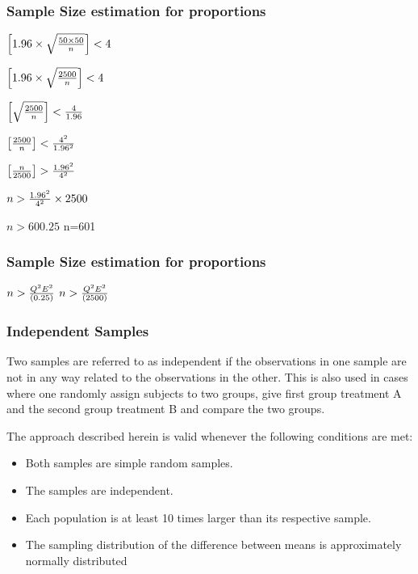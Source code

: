 \begin{frame}
\frametitle{Sample Size estimation for proportions}

$\left[1.96 \times \sqrt{{ 50 \times 50 \over n}} \right]< 4 $


$\left[1.96 \times \sqrt{{ 2500 \over n}} \right]< 4 $

$\left[ \sqrt{{ 2500 \over n}} \right]< {4 \over 1.96}$

$\left[ { 2500 \over n} \right]< {4^2 \over 1.96^2}$

$\left[ { n \over 2500} \right]> {1.96^2 \over 4^2}$

$n> {1.96^2 \over 4^2} \times 2500$

$n>600.25$ 
n=601
\end{frame}
\begin{frame}

\frametitle{Sample Size estimation for proportions}


$n> {Q^2E^2 \over (0.25)}$
$n >{Q^2 E^2 \over (2500)}$

\end{frame}
\begin{frame}
\frametitle{Independent Samples}

Two samples are referred to as independent if the observations in one sample are not in any way related to the observations in the other. This is also used in cases where one randomly assign subjects to two groups, give first group treatment A and the second group treatment B and compare the two groups.


The approach described herein is valid whenever the following conditions are met:

\begin{itemize}
\item Both samples are simple random samples.
\item The samples are independent.
\item Each population is at least 10 times larger than its respective sample.
\item The sampling distribution of the difference between means is approximately normally distributed
\end{itemize}

\end{frame}
